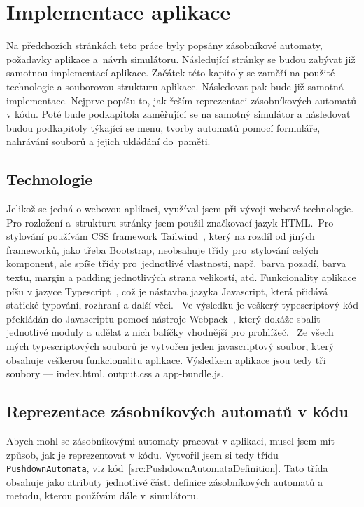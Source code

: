 \chapter{Implementace aplikace}\label{chap:AppImplemetation}

Na předchozích stránkách teto práce byly popsány zásobníkové automaty, požadavky aplikace a~návrh simulátoru. Následující stránky se budou zabývat již samotnou implementací aplikace. Začátek této kapitoly se zaměří na použité technologie a souborovou strukturu aplikace. Následovat pak bude již samotná implementace. Nejprve popíšu to, jak řeším reprezentaci zásobníkových automatů v kódu. Poté bude podkapitola zaměřující se na samotný simulátor a následovat budou podkapitoly týkající se menu, tvorby automatů pomocí formuláře, nahrávání souborů a jejich ukládání do~paměti.

\section{Technologie}

Jelikož se jedná o webovou aplikaci, využíval jsem při vývoji webové technologie. Pro rozložení a~strukturu stránky jsem použil značkovací jazyk HTML.\ Pro stylování používám CSS framework Tailwind~\cite{Tailwind}, který na rozdíl od jiných frameworků, jako třeba Bootstrap, neobsahuje třídy pro~stylování celých komponent, ale spíše třídy pro~jednotlivé vlastnosti, např.~barva pozadí, barva textu, margin a padding jednotlivých strana velikostí, atd. Funkcionality aplikace píšu v jazyce Typescript~\cite{Typescript}, což je nástavba jazyka Javascript, která přidává statické typování, rozhraní a další věci.\ \cite{Kvapil2018} Ve výsledku je veškerý typescriptový kód překládán do Javascriptu pomocí nástroje Webpack~\cite{Webpack}, který dokáže sbalit jednotlivé moduly a udělat z nich balíčky vhodnější pro prohlížeč.\ \cite{Janca2017} Ze všech mých typescriptových souborů je vytvořen jeden javascriptový soubor, který obsahuje veškerou funkcionalitu aplikace. Výsledkem aplikace jsou tedy tři soubory --- index.html, output.css a app-bundle.js.

\section{Reprezentace zásobníkových automatů v kódu}

Abych mohl se zásobníkovými automaty pracovat v aplikaci, musel jsem mít způsob, jak je reprezentovat v kódu. Vytvořil jsem si tedy třídu \texttt{PushdownAutomata}, viz kód~\ref{src:PushdownAutomataDefinition}. Tato třída obsahuje jako atributy jednotlivé části definice zásobníkových automatů a metodu, kterou používám dále v~simulátoru.

